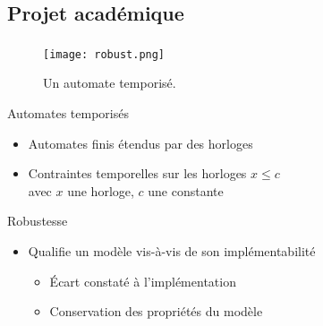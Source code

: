 \documentclass{beamer}
\begin{document}
     \subsection{Projet académique}
       \begin{frame}
         \frametitle{\secname}
         \framesubtitle{\subsecname}

        \begin{figure}
          \centering
          \texttt{[image: robust.png]}
          \caption{Un automate temporisé.}
        \end{figure}

         \begin{block}{{\footnotesize\cite{alur94}} Automates temporisés}
           \begin{itemize}
             \item Automates finis étendus par des horloges 
             \item Contraintes temporelles sur les horloges \hfill $x \leq c$ \\
               \small avec $x$ une horloge, $c$ une constante
           \end{itemize}
         \end{block}

         \pause
         \begin{block}{Robustesse}
           \begin{itemize}
           \item Qualifie un modèle vis-à-vis de son implémentabilité
             \begin{itemize}
               \item Écart constaté à l'implémentation
               \item Conservation des propriétés du modèle
             \end{itemize}
           \end{itemize}
         \end{block}
       \end{frame}
\end{document}
